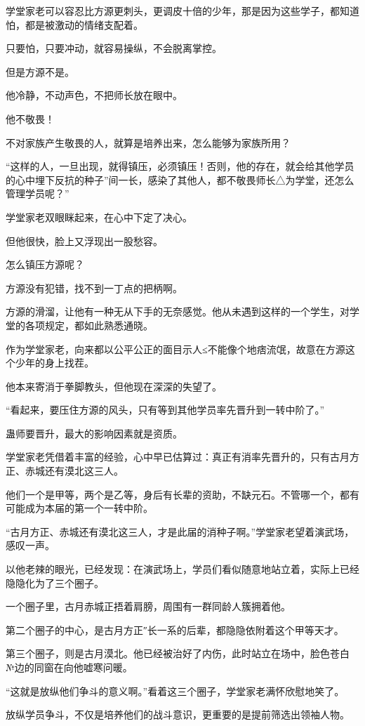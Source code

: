 \begin{this_body}
学堂家老可以容忍比方源更刺头，更调皮十倍的少年，那是因为这些学子，都知道怕，都是被激动的情绪支配着。

只要怕，只要冲动，就容易操纵，不会脱离掌控。

但是方源不是。

他冷静，不动声色，不把师长放在眼中。

他不敬畏！

不对家族产生敬畏的人，就算是培养出来，怎么能够为家族所用？

“这样的人，一旦出现，就得镇压，必须镇压！否则，他的存在，就会给其他学员的心中埋下反抗的种子”间一长，感染了其他人，都不敬畏师长△为学堂，还怎么管理学员呢？”

学堂家老双眼眯起来，在心中下定了决心。

但他很快，脸上又浮现出一股愁容。

怎么镇压方源呢？

方源没有犯错，找不到一丁点的把柄啊。

方源的滑溜，让他有一种无从下手的无奈感觉。他从未遇到这样的一个学生，对学堂的各项规定，都如此熟悉通晓。

作为学堂家老，向来都以公平公正的面目示人≤不能像个地痞流氓，故意在方源这个少年的身上找茬。

他本来寄消于拳脚教头，但他现在深深的失望了。

“看起来，要压住方源的风头，只有等到其他学员率先晋升到一转中阶了。”

蛊师要晋升，最大的影响因素就是资质。

学堂家老凭借着丰富的经验，心中早已估算过：真正有消率先晋升的，只有古月方正、赤城还有漠北这三人。

他们一个是甲等，两个是乙等，身后有长辈的资助，不缺元石。不管哪一个，都有可能成为本届的第一个一转中阶。

“古月方正、赤城还有漠北这三人，才是此届的消种子啊。”学堂家老望着演武场，感叹一声。

以他老辣的眼光，已经发现：在演武场上，学员们看似随意地站立着，实际上已经隐隐化为了三个圈子。

一个圈子里，古月赤城正捂着肩膀，周围有一群同龄人簇拥着他。

第二个圈子的中心，是古月方正″长一系的后辈，都隐隐依附着这个甲等天才。

第三个圈子，则是古月漠北。他已经被治好了内伤，此时站立在场中，脸色苍白№边的同窗在向他嘘寒问暖。

“这就是放纵他们争斗的意义啊。”看着这三个圈子，学堂家老满怀欣慰地笑了。

放纵学员争斗，不仅是培养他们的战斗意识，更重要的是提前筛选出领袖人物。


\end{this_body}
